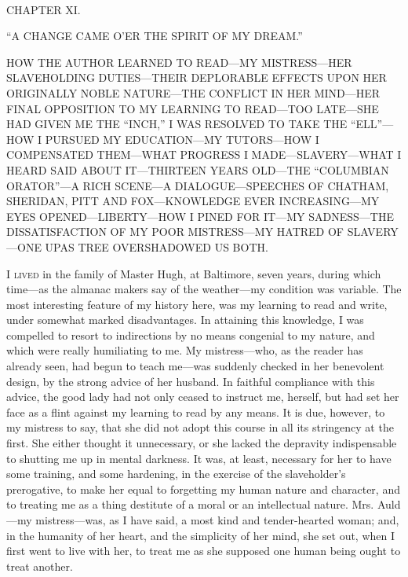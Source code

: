 {\protect\hypertarget{151}{}{}}

~

{CHAPTER XI.}

``A CHANGE CAME O'ER THE SPIRIT OF MY DREAM.''

{HOW THE AUTHOR LEARNED TO READ---MY MISTRESS---HER SLAVEHOLDING
DUTIES---THEIR DEPLORABLE EFFECTS UPON HER ORIGINALLY NOBLE NATURE---THE
CONFLICT IN HER MIND---HER FINAL OPPOSITION TO MY LEARNING TO READ---TOO
LATE---SHE HAD GIVEN ME THE ``INCH,'' I WAS RESOLVED TO TAKE THE
``ELL''---HOW I PURSUED MY EDUCATION---MY TUTORS---HOW I COMPENSATED
THEM---WHAT PROGRESS I MADE---SLAVERY---WHAT I HEARD SAID ABOUT
IT---THIRTEEN YEARS OLD---THE ``COLUMBIAN ORATOR''---A RICH SCENE---A
DIALOGUE---SPEECHES OF CHATHAM, SHERIDAN, PITT AND FOX---KNOWLEDGE EVER
INCREASING---MY EYES OPENED---LIBERTY---HOW I PINED FOR IT---MY
SADNESS---THE DISSATISFACTION OF MY POOR MISTRESS---MY HATRED OF
SLAVERY---ONE UPAS TREE OVERSHADOWED US BOTH.}

\textsc{I lived} in the family of Master Hugh, at Baltimore, seven
years, during which time---as the almanac makers say of the weather---my
condition was variable. The most interesting feature of my history here,
was my learning to read and write, under somewhat marked disadvantages.
In attaining this knowledge, I was compelled to resort to indirections
by no means congenial to my nature, and which were really humiliating to
me. My mistress---who, as the reader has already seen, had begun to
teach me---was suddenly checked in her benevolent design, by the strong
advice of her husband. In faithful compliance with this advice, the good
lady had not only ceased to instruct me, herself, but had set her face
as a flint against my learning to read by any means. It is due,
{\protect\hypertarget{152}{}{}}however, to my mistress to say, that she
did not adopt this course in all its stringency at the first. She either
thought it unnecessary, or she lacked the depravity indispensable to
shutting me up in mental darkness. It was, at least, necessary for her
to have some training, and some hardening, in the exercise of the
slaveholder's prerogative, to make her equal to forgetting my human
nature and character, and to treating me as a thing destitute of a moral
or an intellectual nature. Mrs. Auld---my mistress---was, as I have
said, a most kind and tender-hearted woman; and, in the humanity of her
heart, and the simplicity of her mind, she set out, when I first went to
live with her, to treat me as she supposed one human being ought to
treat another.

